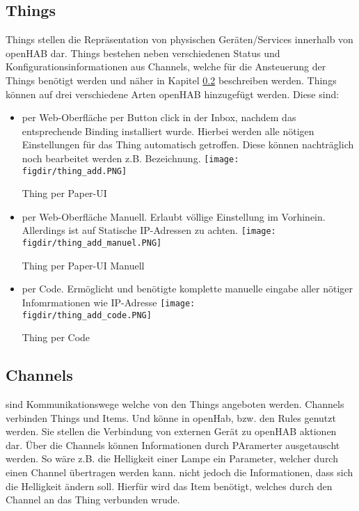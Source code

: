 \subsection{Things}
Things stellen die Repräsentation von physischen Geräten/Services innerhalb von openHAB dar. Things bestehen neben verschiedenen Status und Konfigurationsinformationen aus Channels, welche für die Ansteuerung der Things benötigt werden und näher in Kapitel \ref{sec:channels} beschreiben werden.
Things können auf drei verschiedene Arten openHAB hinzugefügt werden. Diese sind:
\begin{itemize}
	\item per Web-Oberfläche per Button click in der Inbox, nachdem das entsprechende Binding installiert wurde. Hierbei werden alle nötigen Einstellungen für das Thing automatisch getroffen. Diese können nachträglich noch bearbeitet werden z.B. Bezeichnung. 
		\captionsetup{type=figure}
		\texttt{[image: \\figdir/thing\_add.PNG]}
		\caption{Thing per Paper-UI \label{fig:thing-add-paper-ui}}
		
	\item per Web-Oberfläche Manuell. Erlaubt völlige Einstellung im Vorhinein. Allerdings ist auf Statische IP-Adressen zu achten.
		\captionsetup{type=figure}
		\texttt{[image: \\figdir/thing\_add\_manuel.PNG]}
		\caption{Thing per Paper-UI Manuell \label{fig:thing-add-paper-ui-manuel}}
		
	\item per Code. Ermöglicht und benötigte komplette manuelle eingabe aller nötiger Infomrmationen wie IP-Adresse
		\captionsetup{type=figure}
		\texttt{[image: \\figdir/thing\_add\_code.PNG]}
		\caption{Thing per Code \label{fig:thing-add-code}}
\end{itemize}

\subsection{Channels} \label{sec:channels}
sind Kommunikationswege welche von den Things angeboten werden. Channels verbinden Things und Items. Und könne in openHab, bzw. den Rules genutzt werden. Sie stellen die Verbindung von externen Gerät zu openHAB aktionen dar. Über die Channels können Informationen durch PAramerter ausgetauscht werden. So wäre z.B. die Helligkeit einer Lampe ein Parameter, welcher durch einen Channel übertragen werden kann. nicht jedoch die Informationen, dass sich die Helligkeit ändern soll. Hierfür wird das Item benötigt, welches durch den Channel an das Thing verbunden wrude.

